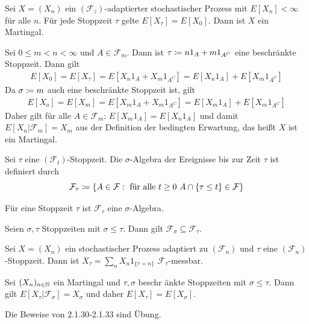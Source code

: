 \documentclass[a4paper,twoside,DIV15,BCOR12mm]{scrbook}
\newcommand{\cF}{\mathcal F}
\begin{document}
\begin{satz}
Sei $X=(X_n)$ ein $(\cF_z)$-adaptierter stochastischer Prozess mit $E[X_n]<\infty$ für alle $n$. Für jede Stoppzeit $\tau$ gelte $E[X_\tau]=E[X_0]$. Dann ist $X$ ein Martingal.
\end{satz}

\begin{beweis}
Sei $0\leq m<n<\infty$ und $A\in \cF_m$. Dann ist $\tau\da n 1_A+m 1_{A^C}$ eine beschränkte Stoppzeit. Dann gilt
\begin{align*}
E[X_0]=E[X_\tau]=E[X_n 1_A+X_m 1_{A^C}]=E[X_n1_A]+E[X_m1_{A^C}]
\end{align*}
Da $\sigma\da m$ auch eine beschränkte Stoppzeit ist, gilt
\begin{align*}
E[X_o]=E[X_m]=E[X_m 1_A+X_m 1_{A^C}]=E[X_m1_A]+E[X_m1_{A^C}]
\end{align*}
Daher gilt für alle $A\in \cF_m$: $E[X_m1_A]=E[X_n1_A]$ und damit $E[X_n|\cF_m]=X_m$ aus der Definition der bedingten Erwartung, das heißt $X$ ist ein Martingal. 
\end{beweis}

\begin{definition}
Sei $\tau$ eine $(\cF_t)$-Stoppzeit. Die $\sigma$-Algebra der Ereignisse bis zur Zeit $\tau$ ist definiert durch 
\[
\cF_\tau\da \{A\in \cF: \mbox{ für alle } t\geq0 \mbox{ } A\cap\{\tau\leq t\}\in \cF\}
\]

\end{definition}

\begin{lemma}
Für eine Stoppzeit $\tau$ ist $\cF_\tau$ eine $\sigma$-Algebra.
\end{lemma}

\begin{lemma}
Seien $\sigma,\tau$ Stoppzeiten mit $\sigma \leq \tau$. Dann gilt $\cF_\sigma\subseteq\cF_\tau$.
\end{lemma}

\begin{lemma}
Sei $X=(X_n)$ ein stochastischer Prozess adaptiert zu $(\cF_n)$ und $\tau$ eine $(\cF_n)$-Stoppzeit. Dann ist $X_\tau=\sum\limits_nX_n1_{\{\tau=n\}}$ $\cF_\tau$-messbar.
\end{lemma}

\begin{satz}
Sei $(X_n)_{n\in\mathbb{N}}$ ein Martingal und $\tau,\sigma$ beschr änkte Stoppzeiten mit $\sigma\leq\tau$. Dann gilt $E[X_\tau|\cF_\sigma]=X_\sigma$ und daher $E[X_\tau]=E[X_\sigma]$.
\end{satz}
\begin{beweis}
Die Beweise von 2.1.30-2.1.33 sind \"Ubung.
\end{beweis}
\end{document}
